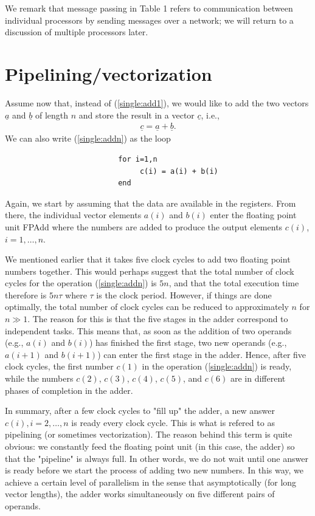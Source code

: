 \documentclass[11pt]{article}
\begin{document}
We remark that message passing in Table 1 refers to communication 
between individual processors by sending messages over a network; 
we will return to a discussion of multiple processors later.


\section{Pipelining/vectorization}

Assume now that, instead of (\ref{single:add1}), we would like to add the 
two vectors $\underline{a}$ and $\underline{b}$ of length $n$
and store the result in a vector $\underline{c}$, 
i.e., 
\begin{align}
 \underline{c} = \underline{a} + \underline{b} .
 \label{single:addn}
 \end{align}
We can also write (\ref{single:addn}) as the loop
\begin{verbatim}
                          for i=1,n
                               c(i) = a(i) + b(i)
                          end
\end{verbatim}
Again, we start by assuming that the data are available in the registers.
From there, the individual vector elements $a(i)$ and $b(i)$ 
enter the floating point unit FPAdd where the numbers are added 
to produce the output elements $c(i)$, $i=1,\ldots,n$. 

We mentioned earlier that it takes five clock cycles to add two floating point 
numbers together. This would perhaps suggest that the total number of clock 
cycles for the operation (\ref{single:addn}) is $5n$, and that the total 
execution time therefore is $5n\tau$ where $\tau$ is the clock period. 
However, if things are done optimally, the total number of clock cycles 
can be reduced to approximately $n$ for $n\gg 1$. 
The reason for this is that the five stages in the adder correspond to 
independent tasks. This means that, as soon as  the addition of two 
operands (e.g., $a(i)$ and $b(i)$) has finished the first stage, 
two new operands (e.g., $a(i+1)$ and $b(i+1)$) can enter the first 
stage in the adder. Hence, after five clock cycles, the first number $c(1)$ 
in the operation (\ref{single:addn}) is ready, while the numbers
$c(2)$, $c(3)$, $c(4)$, $c(5)$, and $c(6)$ are in different phases of completion
in the adder. 

In summary, after a few clock cycles to "fill up" the adder, a new answer 
$c(i), i=2,\ldots,n$ is ready every clock cycle. This is what is refered to 
as pipelining (or sometimes vectorization). The reason behind this term is 
quite obvious: we constantly feed the floating point unit (in this case, the adder)
so that the "pipeline" is always full. In other words, we do not wait until one 
answer is ready before we start the process of adding two new numbers. 
In this way, we achieve a certain level of parallelism in the sense that 
asymptotically (for long vector lengths), the adder works simultaneously 
on five different pairs of operands. 
\end{document}
